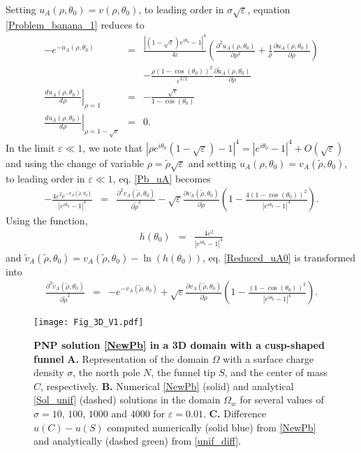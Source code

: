 \documentclass[12pt]{article}
\newcommand{\ds}{\displaystyle}
\newcommand{\beq}{\begin{eqnarray}}
\newcommand{\eeq}{\end{eqnarray}}
\newcommand{\p}{\partial}
\newcommand{\eps}{\varepsilon}
\begin{document}
Setting $u_A(\rho,\theta_0)=v(\rho, \theta_0)$, to leading order in $\sigma\sqrt{\eps}$, equation \eqref{Problem_banana_1} reduces to
\beq\label{Pb_uA}
-e^ {-\ds u_A(\rho,\theta_0)  }&=&\frac{|(1-\sqrt{\eps})e^{i\theta_0}-1|^4}{4\eps}\left(\frac{\p^2 u_A(\rho,\theta_0)}{\p \rho^2}+\frac{1}{\rho}\frac{\p u_A(\rho,\theta_0)}{\p \rho}  \right)\\
&&  -\frac{ \rho(1-\cos(\theta_0))^2}{\eps^{3/2}}\frac{\p\tilde u_A(\rho,\theta_0)}{\p\rho}\nonumber\\
\left.\frac{d u_A(\rho,\theta_0)}{d \rho}\right|_{\rho=1} &=& -\frac{ \sqrt{\eps} }{ 1-\cos(\theta_0)}\nonumber \\
\left.\frac{d u_A(\rho,\theta_0)}{d \rho}\right|_{\rho=1-\sqrt{\eps}} &=& 0.\nonumber
\eeq
In the limit $\eps\ll1$, we note that $ |\rho e^{i\theta_0}(1-\sqrt{\eps})-1|^4=|e^{i\theta_0}-1|^4+O(\sqrt{\eps})$ and
using the change of variable $\rho = \tilde \rho \sqrt{\eps}$ and setting $ u_A(\rho,\theta_0)= v_A(\tilde \rho,\theta_0)$, to leading order in $\eps\ll1$, eq. \eqref{Pb_uA} becomes
\beq\label{Reduced_uA0}
-\frac{4\eps^2e^ {-\ds  v_A(\tilde \rho,\theta_0) }}{|e^{i\theta_0}-1|^4}&=& \frac{\p^2   v_A(\tilde \rho,\theta_0)}{\p  \tilde\rho^2}-\sqrt{\eps}\frac{\p   v_A(\tilde \rho,\theta_0)}{\p \tilde\rho}\left( 1-\frac{ 4(1-\cos(\theta_0))^2 }{|e^{i\theta_0}-1|^4}\right).
\eeq
Using the function,
\beq\label{h0}
h(\theta_0)&=&\frac{4\eps^2 }{|e^{i\theta_0}-1|^4}
\eeq
and $\tilde v_A(\tilde \rho,\theta_0)=v_A(\tilde \rho,\theta_0)-\ln(h(\theta_0))$, eq. \eqref{Reduced_uA0} is transformed into
\beq\label{Reduced_uA2}
\frac{\p^2  \tilde v_A(\tilde \rho,\theta_0)}{\p  \tilde\rho^2}&=&-e^ {-\ds  v_A(\tilde \rho,\theta_0) } +\sqrt{\eps}\frac{\p   v_A(\tilde \rho,\theta_0)}{\p \tilde\rho}\left( 1-\frac{ (1-\cos(\theta_0))^2 }{|e^{i\theta_0}-1|^4}\right).
\eeq
\begin{figure}[H]
	\center
	\texttt{[image: Fig\_3D\_V1.pdf]}
	\caption{ {\small  {\bf PNP solution \eqref{NewPb} in a 3D domain with a cusp-shaped funnel}
		{\bf A.} Representation of the domain $\Omega$ with a surface charge density $\sigma$, the north pole $N$, the funnel tip $S$, and the center of mass $C$, respectively.
		{\bf B. } Numerical \eqref{NewPb} (solid) and analytical \eqref{Sol_unif} (dashed) solutions in the domain $\Omega_w$ for several values of $\sigma=10,\, 100,\,  1000$ and $4000$ for $\eps=0.01$.
		{\bf C.} Difference $u(C)-u(S)$ computed numerically (solid blue) from \eqref{NewPb} and analytically (dashed green) from \eqref{unif_diff}.   }\label{f:3D_Cusp}}
\end{figure}
\end{document}
